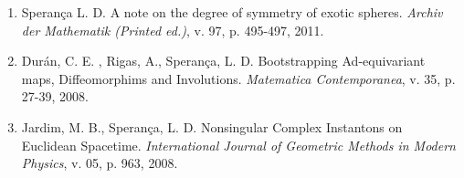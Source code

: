 \documentclass[10pt]{article}
\begin{document}
\begin{enumerate}
	
	
	\item Sperança L. D. A note on the degree of symmetry of exotic spheres. \textit{Archiv der Mathematik (Printed ed.)},  v. 97, p. 495-497, 2011.
	
	
	\item Durán, C. E. , Rigas, A., Sperança, L. D.  Bootstrapping Ad-equivariant maps, Diffeomorphims and Involutions. \textit{Matematica Contemporanea},  v. 35, p. 27-39, 2008.
	
	\item Jardim, M. B., Sperança, L. D. Nonsingular Complex Instantons on Euclidean Spacetime. \textit{International Journal of Geometric Methods in Modern Physics}, v. 05, p. 963, 2008.
	
\end{enumerate}
\end{document}

